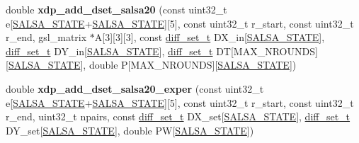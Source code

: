 \begin{DoxyCompactItemize}
\item 
\hypertarget{salsa_8hh_a87c47e09c7ee4b307288ff0eae8a7516}{double {\bfseries xdp\-\_\-add\-\_\-dset\-\_\-salsa20} (const uint32\-\_\-t e\mbox{[}\hyperlink{salsa_8hh_a642186115ff24eb2f42febb3ccaa093f}{\-S\-A\-L\-S\-A\-\_\-\-S\-T\-A\-T\-E}+\hyperlink{salsa_8hh_a642186115ff24eb2f42febb3ccaa093f}{\-S\-A\-L\-S\-A\-\_\-\-S\-T\-A\-T\-E}\mbox{]}\mbox{[}5\mbox{]}, const uint32\-\_\-t r\-\_\-start, const uint32\-\_\-t r\-\_\-end, gsl\-\_\-matrix $\ast$\-A\mbox{[}3\mbox{]}\mbox{[}3\mbox{]}\mbox{[}3\mbox{]}, const \hyperlink{structdiff__set__t}{diff\-\_\-set\-\_\-t} \-D\-X\-\_\-in\mbox{[}\hyperlink{salsa_8hh_a642186115ff24eb2f42febb3ccaa093f}{\-S\-A\-L\-S\-A\-\_\-\-S\-T\-A\-T\-E}\mbox{]}, \hyperlink{structdiff__set__t}{diff\-\_\-set\-\_\-t} \-D\-Y\-\_\-in\mbox{[}\hyperlink{salsa_8hh_a642186115ff24eb2f42febb3ccaa093f}{\-S\-A\-L\-S\-A\-\_\-\-S\-T\-A\-T\-E}\mbox{]}, \hyperlink{structdiff__set__t}{diff\-\_\-set\-\_\-t} \-D\-T\mbox{[}\-M\-A\-X\-\_\-\-N\-R\-O\-U\-N\-D\-S\mbox{]}\mbox{[}\hyperlink{salsa_8hh_a642186115ff24eb2f42febb3ccaa093f}{\-S\-A\-L\-S\-A\-\_\-\-S\-T\-A\-T\-E}\mbox{]}, double \-P\mbox{[}\-M\-A\-X\-\_\-\-N\-R\-O\-U\-N\-D\-S\mbox{]}\mbox{[}\hyperlink{salsa_8hh_a642186115ff24eb2f42febb3ccaa093f}{\-S\-A\-L\-S\-A\-\_\-\-S\-T\-A\-T\-E}\mbox{]})}\label{salsa_8hh_a87c47e09c7ee4b307288ff0eae8a7516}

\item 
\hypertarget{salsa_8hh_ad1843b8eae9d9ec19b88d98c3fe65ed2}{double {\bfseries xdp\-\_\-add\-\_\-dset\-\_\-salsa20\-\_\-exper} (const uint32\-\_\-t e\mbox{[}\hyperlink{salsa_8hh_a642186115ff24eb2f42febb3ccaa093f}{\-S\-A\-L\-S\-A\-\_\-\-S\-T\-A\-T\-E}+\hyperlink{salsa_8hh_a642186115ff24eb2f42febb3ccaa093f}{\-S\-A\-L\-S\-A\-\_\-\-S\-T\-A\-T\-E}\mbox{]}\mbox{[}5\mbox{]}, const uint32\-\_\-t r\-\_\-start, const uint32\-\_\-t r\-\_\-end, uint32\-\_\-t npairs, const \hyperlink{structdiff__set__t}{diff\-\_\-set\-\_\-t} \-D\-X\-\_\-set\mbox{[}\hyperlink{salsa_8hh_a642186115ff24eb2f42febb3ccaa093f}{\-S\-A\-L\-S\-A\-\_\-\-S\-T\-A\-T\-E}\mbox{]}, \hyperlink{structdiff__set__t}{diff\-\_\-set\-\_\-t} \-D\-Y\-\_\-set\mbox{[}\hyperlink{salsa_8hh_a642186115ff24eb2f42febb3ccaa093f}{\-S\-A\-L\-S\-A\-\_\-\-S\-T\-A\-T\-E}\mbox{]}, double \-P\-W\mbox{[}\hyperlink{salsa_8hh_a642186115ff24eb2f42febb3ccaa093f}{\-S\-A\-L\-S\-A\-\_\-\-S\-T\-A\-T\-E}\mbox{]})}\label{salsa_8hh_ad1843b8eae9d9ec19b88d98c3fe65ed2}


\end{DoxyCompactItemize}
